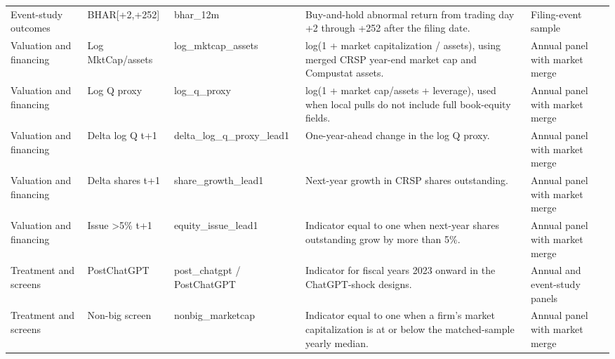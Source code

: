 \begin{longtable}{p{}p{}p{}p{}p{}}
Event-study outcomes & BHAR[+2,+252] & bhar\_12m & Buy-and-hold abnormal return from trading day +2 through +252 after the filing date. & Filing-event sample \\
Valuation and financing & Log MktCap/assets & log\_mktcap\_assets & log(1 + market capitalization / assets), using merged CRSP year-end market cap and Compustat assets. & Annual panel with market merge \\
Valuation and financing & Log Q proxy & log\_q\_proxy & log(1 + market cap/assets + leverage), used when local pulls do not include full book-equity fields. & Annual panel with market merge \\
Valuation and financing & Delta log Q t+1 & delta\_log\_q\_proxy\_lead1 & One-year-ahead change in the log Q proxy. & Annual panel with market merge \\
Valuation and financing & Delta shares t+1 & share\_growth\_lead1 & Next-year growth in CRSP shares outstanding. & Annual panel with market merge \\
Valuation and financing & Issue >5\% t+1 & equity\_issue\_lead1 & Indicator equal to one when next-year shares outstanding grow by more than 5\%. & Annual panel with market merge \\
Treatment and screens & PostChatGPT & post\_chatgpt / PostChatGPT & Indicator for fiscal years 2023 onward in the ChatGPT-shock designs. & Annual and event-study panels \\
Treatment and screens & Non-big screen & nonbig\_marketcap & Indicator equal to one when a firm's market capitalization is at or below the matched-sample yearly median. & Annual panel with market merge \\
\hline
\end{longtable}
